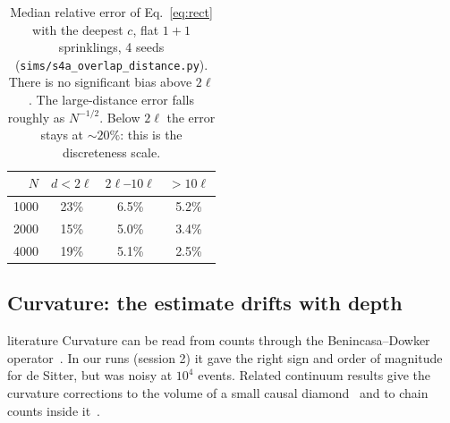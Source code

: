 \documentclass[11pt,a4paper]{article}
\newcommand{\tagbox}[2]{\textsf{\scriptsize\colorbox{#1!12}{\textcolor{#1!70!black}{#2}}}}
\newcommand{\lit}{\tagbox{blue}{literature}}
\begin{document}
\begin{table}[t]
\centering\small
\begin{tabular}{@{}rccc@{}}
\toprule
$N$ & $d<2\ell$ & $2\ell$--$10\ell$ & $>10\ell$\\
\midrule
1000 & 23\% & 6.5\% & 5.2\%\\
2000 & 15\% & 5.0\% & 3.4\%\\
4000 & 19\% & 5.1\% & 2.5\%\\
\bottomrule
\end{tabular}
\caption{Median relative error of Eq.~\eqref{eq:rect} with the deepest $c$, flat $1+1$ sprinklings, 4 seeds (\texttt{sims/s4a\_overlap\_distance.py}). There is no significant bias above $2\ell$. The large-distance error falls roughly as $N^{-1/2}$. Below $2\ell$ the error stays at $\sim20\%$: this is the discreteness scale.}
\label{tab:dist}
\end{table}

\subsection{Curvature: the estimate drifts with depth}
\lit{} Curvature can be read from counts through the Benincasa--Dowker operator~\cite{BD10,DowkerGlaser13}. In our runs (session 2) it gave the right sign and order of magnitude for de Sitter, but was noisy at $10^4$ events. Related continuum results give the curvature corrections to the volume of a small causal diamond~\cite{GibbonsSolodukhin07} and to chain counts inside it~\cite{RSS13}.
\end{document}
